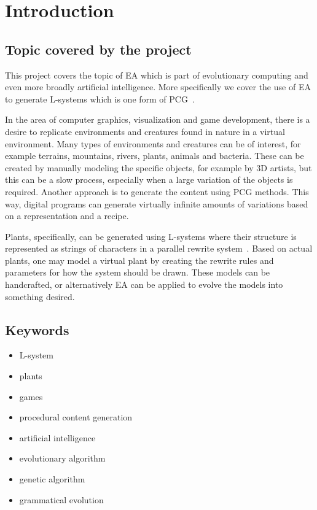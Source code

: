 \chapter{Introduction}
\label{chap:introduction}

\section{Topic covered by the project}
This project covers the topic of \gls{EA} which is part of evolutionary computing and even more broadly artificial intelligence.
More specifically we cover the use of \gls{EA} to generate \glspl{L-system} which is one form of \gls{PCG}~\cite{PCG_5}.

In the area of computer graphics, visualization and game development, there is a desire to replicate environments and creatures found in nature in a virtual environment. %
Many types of environments and creatures can be of interest, for example terrains, mountains, rivers, plants, animals and bacteria.
These can be created by manually modeling the specific objects, for example by 3D artists, but this can be a slow process, especially when a large variation of the objects is required.
Another approach is to generate the content using \gls{PCG} methods.
This way, digital programs can generate virtually infinite amounts of variations based on a representation and a recipe.

Plants, specifically, can be generated using \glspl{L-system} where their structure is represented as strings of characters in a parallel rewrite system~\cite{2012Prusinkiewicz}.
Based on actual plants, one may model a virtual plant by creating the rewrite rules and parameters for how the system should be drawn.
These models can be handcrafted, or alternatively \gls{EA} can be applied to evolve the models into something desired.

\section{Keywords}
\begin{itemize}
    \item L-system
    \item plants
    \item games
    \item procedural content generation
    \item artificial intelligence
    \item evolutionary algorithm
    \item genetic algorithm
    \item grammatical evolution
\end{itemize}

